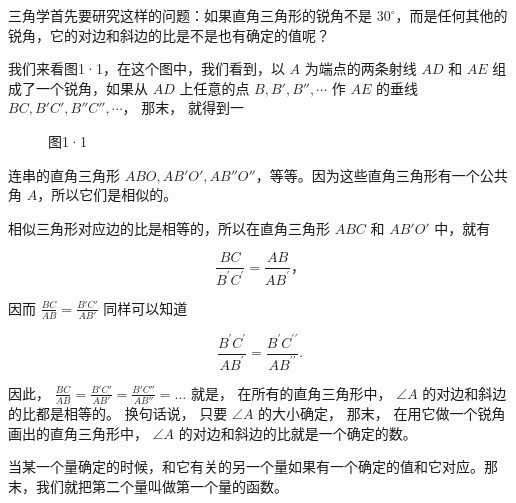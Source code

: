三角学首先要研究这样的问题：如果直角三角形的锐角不是
\(30^{\circ}\)，而是任何其他的锐角，它的对边和斜边的比是不是也有确定的值呢？

我们来看图1·1，在这个图中，我们看到，以 \(A\) 为端点的两条射线 \(AD\) 和
\(AE\) 组成了一个锐角，如果从 \(AD\) 上任意的点 \(B, B', B'', \cdots\)
作 \(AE\) 的垂线 \(BC, B'C', B''C'', \cdots\)， 那末， 就得到一

\begin{figure}
\centering
{}
\caption{图1·1}
\end{figure}


连串的直角三角形
\(ABO, AB'O', AB''O''\)，等等。因为这些直角三角形有一个公共角
\(A\)，所以它们是相似的。

相似三角形对应边的比是相等的，所以在直角三角形 \(ABC\) 和 \(AB'O'\)
中，就有

\[
\frac {B C}{B ^{\prime} C ^{\prime}} = \frac {A B}{A B ^{\prime}}\text{，}
\]

因而 \(\frac{BC}{AB} = \frac{B'C'}{AB'}\) 同样可以知道

\[
\frac {B ^{\prime} C ^{\prime}}{A B ^{\prime}} = \frac {B ^{\prime} C ^ {\prime \prime}}{A B ^ {\prime \prime}}.
\]

因此， \(\frac{BC}{AB} = \frac{B'C'}{AB'} = \frac{B'C''}{AB''} = \dots\)
就是， 在所有的直角三角形中， \(\angle A\) 的对边和斜边的比都是相等的。
换句话说， 只要 \(\angle A\) 的大小确定， 那末，
在用它做一个锐角画出的直角三角形中， \(\angle A\)
的对边和斜边的比就是一个确定的数。

当某一个量确定的时候，和它有关的另一个量如果有一个确定的值和它对应。那末，我们就把第二个量叫做第一个量的函数。

